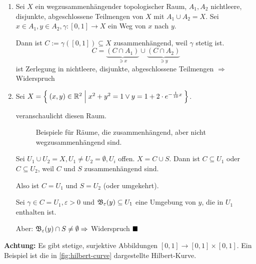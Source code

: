 \begin{beweis}\leavevmode
    \begin{enumerate}[label=(\roman*)]
    \item Sei $X$ ein wegzusammenhängender topologischer Raum, $A_1, A_2$
    nichtleere, disjunkte, abgeschlossene Teilmengen von $X$ mit
    $A_1 \cup A_2 = X$. Sei $x \in A_1, y \in A_2, \gamma:[0,1] \rightarrow X$
    ein Weg von $x$ nach $y$.

    Dann ist $C:= \gamma([0,1]) \subseteq X$ zusammenhängend, weil 
    $\gamma$ stetig ist.
    \[C = \underbrace{(C \cap A_1)}_{\ni x} \cup \underbrace{(C \cap A_2)}_{\ni y}\]
    ist Zerlegung in nichtleere, disjunkte, abgeschlossene Teilmengen
    $\Rightarrow$ Widerspruch 

    \item Sei $X = \Set{(x,y) \in \ensuremath{\mathbb{R}}^2| x^2 + y^2 = 1 \lor y = 1 +2\cdot e^{-\frac{1}{10} x}}$.

         veranschaulicht diesen Raum.

        \begin{figure}[htp]
            \centering
            \subfloat[Sinus]{
                \resizebox{0.65\linewidth}{!}{}
                \label{fig:sinx}
            }%

            \caption{Beispiele für Räume, die zusammenhängend, aber nicht wegzusammenhängend sind.}
            \label{fig:zusammenhang-beispiele}
        \end{figure}

          Sei $U_1 \cup U_2 = X, U_1 \neq U_2 = \emptyset, U_i$ offen.
          $X = C \cup S$. Dann ist $C \subseteq U_1$ oder $C \subseteq U_2$,
          weil $C$ und $S$ zusammenhängend sind.

          Also ist $C = U_1$ und $S = U_2$ (oder umgekehrt).

          Sei $\gamma \in C = U_1, \varepsilon > 0$ und $\mathfrak{B}_\varepsilon (y) \subseteq U_1$
          eine Umgebung von $y$, die in $U_1$ enthalten ist.

          Aber: $\mathfrak{B}_\varepsilon(y) \cap S \neq \emptyset \Rightarrow$
          Widerspruch 
$\qed$
    \end{enumerate}
\end{beweis}

\textbf{Achtung:} Es gibt stetige, surjektive Abbildungen 
    $[0,1] \rightarrow [0,1] \times [0,1]$. Ein Beispiel ist die
    in \cref{fig:hilbert-curve} dargestellte Hilbert-Kurve.
    
